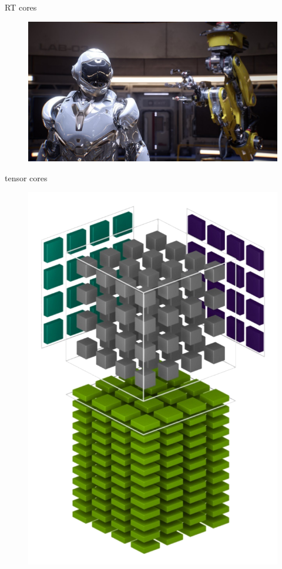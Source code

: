 \documentclass{beamer}
\begin{document}
\begin{frame}{RT cores}
	\begin{figure}
		\includegraphics[scale=0.25]{figures/sol.jpg}
	\end{figure}
\end{frame}

\begin{frame}{tensor cores}
	\begin{figure}
		\includegraphics[scale=0.25]{figures/tensor.png}
	\end{figure}
\end{frame}
\end{document}
